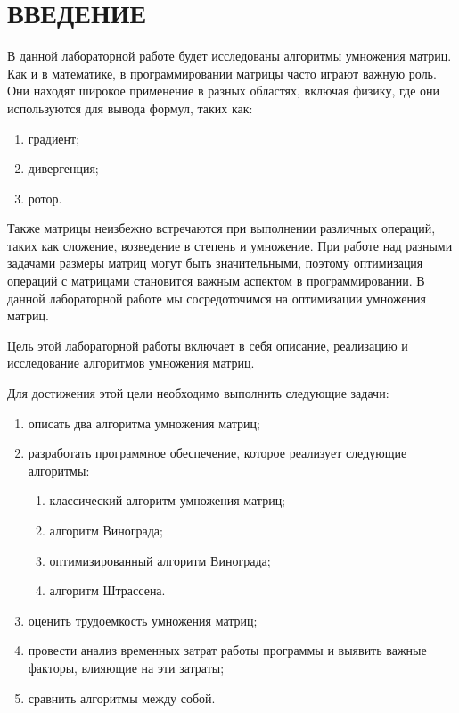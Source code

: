 \chapter*{ВВЕДЕНИЕ}


В данной лабораторной работе будет исследованы алгоритмы умножения матриц. Как и в математике, в программировании матрицы часто играют важную роль. Они находят широкое применение в разных областях, включая физику, где они используются для вывода формул, таких как:
\begin{enumerate}
	\item градиент;
	\item дивергенция;
	\item ротор. \cite{book_matrix}
\end{enumerate}

Также матрицы неизбежно встречаются при выполнении различных операций, таких как сложение, возведение в степень и умножение. При работе над разными задачами размеры матриц могут быть значительными, поэтому оптимизация операций с матрицами становится важным аспектом в программировании. В данной лабораторной работе мы сосредоточимся на оптимизации умножения матриц.

Цель этой лабораторной работы включает в себя описание, реализацию и исследование алгоритмов умножения матриц.

Для достижения этой цели необходимо выполнить следующие задачи:
\begin{enumerate}
	\item описать два алгоритма умножения матриц;
	\item разработать программное обеспечение, которое реализует следующие алгоритмы:
	\begin{enumerate}
		\item классический алгоритм умножения матриц;
		\item алгоритм Винограда;
		\item оптимизированный алгоритм Винограда;
		\item алгоритм Штрассена.
	\end{enumerate}
	\item оценить трудоемкость умножения матриц;
	\item провести анализ временных затрат работы программы и выявить важные факторы, влияющие на эти затраты;
	\item сравнить алгоритмы между собой.
\end{enumerate}
